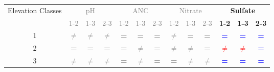 \begin{table}\scriptsize
\begin{center}
\begin{tabular}{ccccccccccccc}
\toprule
\multicolumn{1}{p{1cm}}{Elevation Classes}& \multicolumn{ 3}{c}{\textcolor{gray}{pH}}                                                                & \multicolumn{ 3}{c}{\textcolor{gray}{ANC}}                                         & \multicolumn{ 3}{c}{\textcolor{gray}{Nitrate}}                                         & \multicolumn{ 3}{c}{\textbf{Sulfate}}                                 \\ \cline{2-13}\noalign{\smallskip}
                                                                       & \multicolumn{ 1}{c}{\textcolor{gray}{1-2}} & \textcolor{gray}{1-3}                       & \textcolor{gray}{2-3}                      & \textcolor{gray}{1-2}             & \textcolor{gray}{1-3}                        & \textcolor{gray}{2-3}                      & \textcolor{gray}{1-2}                     & \textcolor{gray}{1-3}                      & \textcolor{gray}{2-3}                     & \textbf{1-2}                       & \textbf{1-3}                     & \textbf {2-3}             \\  \cline{2-13}
\multicolumn{1}{c}{1}                                    & \textcolor{gray}{\textbf{$\neq$}}              & \textcolor{gray}{\textbf{$\neq$}}    & \textcolor{gray}{\textbf{$\neq$}}   & \textcolor{gray}{\textbf{=}} & \textcolor{gray}{\textbf{=}}            & \textcolor{gray}{\textbf{=}}          & \textcolor{gray}{\textbf{$\neq$}}   & \textcolor{gray}{\textbf{=}}         & \textcolor{gray}{\textbf{=}}          & \textcolor{blue}{\textbf{=}}          & \textcolor{blue}{\textbf{=}}         & \textcolor{blue}{\textbf{=}}  \\ 
\multicolumn{1}{c}{2}                                    & \textcolor{gray}{\textbf{=}}                        & \textcolor{gray}{\textbf{=}}          & \textcolor{gray}{\textbf{=}}          & \textcolor{gray}{\textbf{=}} & \textcolor{gray}{\textbf{$\neq$}}    & \textcolor{gray}{\textbf{=}}          & \textcolor{gray}{\textbf{$\neq$}}   & \textcolor{gray}{\textbf{$\neq$}}   & \textcolor{gray}{\textbf{=}}          & \textcolor{red}{\textbf{$\neq$}} & \textcolor{red}{\textbf{$\neq$}} & \textcolor{blue}{\textbf{=}}  \\ 
\multicolumn{1}{c}{3}                                    & \textcolor{gray}{\textbf{$\neq$}}             & \textcolor{gray}{\textbf{$\neq$}}    & \textcolor{gray}{\textbf{$\neq$}}   & \textcolor{gray}{\textbf{=}} & \textcolor{gray}{\textbf{$\neq$}}    & \textcolor{gray}{\textbf{=}}          & \textcolor{gray}{\textbf{=}}          & \textcolor{gray}{\textbf{$\neq$}}   & \textcolor{gray}{\textbf{$\neq$}}   & \textcolor{blue}{\textbf{=}}           & \textcolor{blue}{\textbf{=}}          & \textcolor{blue}{\textbf{=}}  \\ 

\end{tabular}
\end{center}
\end{table}
